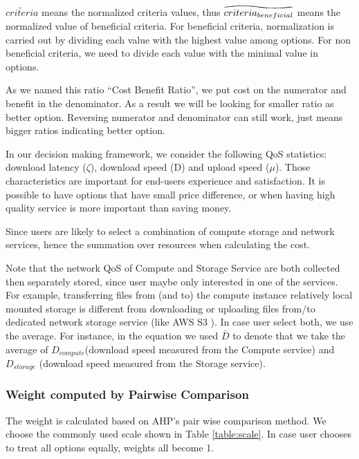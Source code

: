 $\widetilde{criteria}$ means the normalized criteria values, thus $\reallywidetilde{criteria_{beneficial}}$ means the normalized value of beneficial criteria.
For beneficial criteria, normalization is carried out by dividing each value with the highest value among options. For non beneficial criteria, we need to divide each value with the minimal value in options.

As we named this ratio \enquote{Cost Benefit Ratio}, we put cost on the numerator and benefit in the denominator. As a result we will be looking for smaller ratio as better option. Reversing numerator and denominator can still work, just means bigger ratios indicating better option.

In our decision making framework, we consider the following QoS statistics: download latency ($\zeta$), download speed (D) and upload speed ($\mu$). Those characteristics are important for end-users experience and satisfaction. It is possible to have options that have small price difference, or when having high quality service is more important than saving money.

Since users are likely to select a combination of compute storage and network services, hence the summation over resources when calculating the cost.

Note that the network QoS of Compute and Storage Service are both collected then separately stored, since user maybe only interested in one of the services. For example, transferring files from (and to) the compute instance relatively local mounted storage is different from downloading or uploading files from/to dedicated network storage service (like AWS S3 \cite{S3}). In case user select both, we use the average. For instance, in the equation we used $\bar D$ to denote that we take the average of $D_{compute}$(download speed measured from the Compute service) and $D_{storage}$  (download speed measured from the Storage service).

\subsubsection{Weight computed by Pairwise Comparison}
\label{sec:weight&pairwise_comparison}
The weight is calculated based on AHP's pair wise comparison method. We choose the commonly used scale    \cite{ghodsypour1998decision}   \cite{haas2005illustrated} shown in Table \ref{table:scale}. In case user chooses to treat all options equally, weights all become 1.

